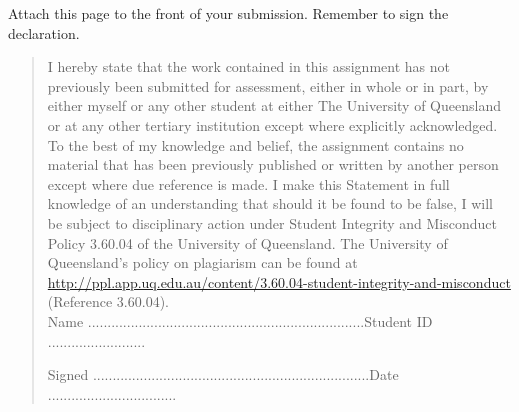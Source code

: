 \documentclass[12pt,english]{article}
\begin{document}
{\large{}Attach this page to the front of your submission. Remember
to sign the declaration.\bigskip{}
}{\large\par}
\begin{quote}
\begin{flushleft}
I hereby state that the work contained in this assignment has not
previously been submitted for assessment, either in whole or in part,
by either myself or any other student at either The University of
Queensland or at any other tertiary institution except where explicitly
acknowledged. To the best of my knowledge and belief, the assignment
contains no material that has been previously published or written
by another person except where due reference is made. I make this
Statement in full knowledge of an understanding that should it be
found to be false, I will be subject to disciplinary action under
Student Integrity and Misconduct Policy 3.60.04 of the University
of Queensland. The University of Queensland's policy on plagiarism
can be found at \href{http://ppl.app.uq.edu.au/content/3.60.04-student-integrity-and-misconduct}{http://ppl.app.uq.edu.au/content/3.60.04-student-integrity-and-misconduct}
(Reference 3.60.04).\\
\vspace{2cm}
Name .......................................................................Student
ID .........................\vspace{2cm}
\par\end{flushleft}

\noindent Signed .......................................................................Date
.................................\vspace{0.5cm}

\end{quote}


\newpage{}

\vspace{4cm}
\end{document}
